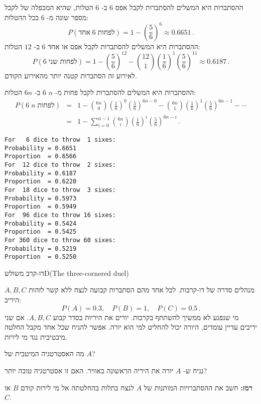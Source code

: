 \solution{}

ההסתברות היא המשלים להסתברות לקבל אפס 
$6$
ב-%
$6$
הטלות, שהיא המכפלה של לקבל מספר שונה מ-%
$6$
בכל ההטלות:
\[
P(\textrm{אחד} \; 6\; \textrm{לפחות})=1-\left(\frac{5}{6}\right)^6\approx 0.6651\,.
\]
ההסתברות היא המשלים להסתברות לקבל אפס או אחד
$6$
ב-%
$12$
הטלות:
\[
P(6\; \textrm{לפחות שני})=1-\left(\frac{5}{6}\right)^{12}-{12\choose 1}\left(\frac{1}{6}\right)^{1}\left(\frac{5}{6}\right)^{11}\approx 0.6187\,.
\]
לאירוע זה הסתברות קטנה יותר מהאירוע הקודם.

ההסתברות היא המשלים להסתברות לקבל פחות מ-%
$n$ $6$
ב-%
$6n$
הטלות:
\begin{eqnarray*}
P(6\; n\;\textrm{לפחות})&=&
  1-{6n \choose 0}\left(\frac{1}{6}\right)^0\left(\frac{5}{6}\right)^{6n-0}-
  {6n\choose 1}\left(\frac{1}{6}\right)^{1}\left(\frac{5}{6}\right)^{6n-1}-\cdots\\
&=&1-\sum_{i=0}^{n-1}{6n\choose i}\left(\frac{1}{6}\right)^{i}\left(\frac{5}{6}\right)^{6n-i}\,.
\end{eqnarray*}

\sml{}

\begin{verbatim}
For   6 dice to throw  1 sixes:
Probability = 0.6651
Proportion  = 0.6566
For  12 dice to throw  2 sixes:
Probability = 0.6187
Proportion  = 0.6220
For  18 dice to throw  3 sixes:
Probability = 0.5973
Proportion  = 0.5949
For  96 dice to throw 16 sixes:
Probability = 0.5424
Proportion  = 0.5425
For 360 dice to throw 60 sixes:
Probability = 0.5219
Proportion  = 0.5250
\end{verbatim}



\begin{prob}{דו-קרב משולש}{D}{(The three-cornered duel)}

$A,B,C$
מנהלים סדרה של דו-קרבות. לכל אחד מהם הסתברות קבועה לנצח ללא קשר לזהות היריב:
\[
P(A)=0.3,\quad P(B)=1, \quad P(C)=0.5\,.
\]
מי שנפגע לא ממשיך להשתתף בקרבות. יורים את היריות בסדר קבוע 
$A,B,C$.
אם שני יריבים עדיין עומדים, היורה יכול להחליט למי הוא יורה. אפשר להניח שכל אחד מקבל החלטה מיבטיבית נגד מי לירות.

מה האסטרטגיה המיטבית של
$A$?

נניח ש-%
$A$
יורה את היריה הראשונה באוויר. האם זו אסטרטגיה טובה יותר?

\textbf{רמז:}
חשב את ההסתברויות המותנות של 
$A$
לנצח בתלות בהחלטתה אל מי לירות קודם
$B$
או
$C$.
\end{prob}

